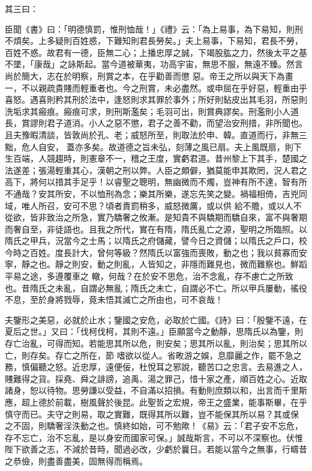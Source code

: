 \begin{pinyinscope}
 其三曰：



 臣聞《書》曰：「明德慎罰，惟刑恤哉！」《禮》云：「為上易事，為下易知，則刑不煩矣。上多疑則百姓惑，下難知則君長勞矣。」夫上易事，下易知，君長不勞，百姓不惑。故君有一德，臣無二心；上播忠厚之誠，下竭股肱之力，然後太平之基不墜，「康哉」之詠斯起。當今道被華夷，功高宇宙，無思不服，無遠不臻。然言尚於簡大，志在於明察，刑賞之本，在乎勸善而懲
 惡。帝王之所以與天下為畫一，不以親疏貴賤而輕重者也。今之刑賞，未必盡然。或申屈在乎好惡，輕重由乎喜怒。遇喜則矜其刑於法中，逢怒則求其罪於事外；所好則鉆皮出其毛羽，所惡則洗垢求其瘢痕。瘢痕可求，則刑斯濫矣；毛羽可出，則賞典謬矣。刑濫則小人道長，賞謬則君子道消。小人之惡不懲，君子之善不勸，而望治安刑措，非所聞也。且夫豫暇清談，皆敦尚於孔、老；威怒所至，則取法於申、韓。直道而行，非無三黜，危人自安，
 蓋亦多矣。故道德之旨未弘，刻薄之風已扇。夫上風既扇，則下生百端，人競趨時，則憲章不一，稽之王度，實虧君道。昔州黎上下其手，楚國之法遂差；張湯輕重其心，漢朝之刑以弊。人臣之頗僻，猶莫能申其欺罔，況人君之高下，將何以措其手足乎！以睿聖之聰明，無幽微而不燭，豈神有所不達，智有所不通哉？安其所安，不以恤刑為念；樂其所樂，遂忘先笑之變。禍福相倚，吉兇同域，唯人所召，安可不思？頃者責罰稍多，威怒微厲，或以供
 給不贍，或以人不從欲，皆非致治之所急，實乃驕奢之攸漸。是知貴不與驕期而驕自來，富不與奢期而奢自至，非徒語也。且我之所代，實在有隋，隋氏亂亡之源，聖明之所臨照。以隋氏之甲兵，況當今之士馬；以隋氏之府儲藏，譬今日之資儲；以隋氏之戶口，校今時之百姓。度長計大，曾何等級？然隋氏以富強而喪敗，動之也；我以貧寡而安寧，靜之也。靜之則安，動之則亂，人皆知之，非隱而難見也，微而難察也。鮮蹈平易之途，多遵覆車之
 轍，何哉？在於安不思危，治不念亂，存不慮亡之所致也。昔隋氏之未亂，自謂必無亂；隋氏之未亡，自謂必不亡。所以甲兵屢動，徭役不息，至於身將戮辱，竟未悟其滅亡之所由也，可不哀哉！



 夫鑒形之美惡，必就於止水；鑒國之安危，必取於亡國。《詩》曰：「殷鑒不遠，在夏后之世。」又曰：「伐柯伐柯，其則不遠。」臣願當今之動靜，思隋氏以為鑒，則存亡治亂，可得而知。若能思其所以危，則安矣；思其所以亂，則治矣；思其所以亡，則存矣。存亡之所在，節
 嗜欲以從人。省畋游之娛，息靡麗之作，罷不急之務，慎偏聽之怒。近忠厚，遠便佞，杜悅耳之邪說，聽苦口之忠言。去易進之人，賤難得之貨。採堯、舜之誹謗，追禹、湯之罪己，惜十家之產，順百姓之心。近取諸身，恕以待物。思勞謙以受益，不自滿以招損。有動則庶類以和，出言而千里斯應，超上德於前載，樹風聲於後昆。此聖哲之宏規，帝王之盛業，能事斯畢，在乎慎守而已。夫守之則易，取之實難，既得其所以難，豈不能保其所以易？其或保
 之不固，則驕奢淫泆動之也。慎終如始，可不勉歟！《易》云：「君子安不忘危，存不忘亡，治不忘亂，是以身安而國家可保。」誠哉斯言，不可以不深察也。伏惟陛下欲善之志，不減於昔時，聞過必改，少虧於曩日。若能以當今之無事，行疇昔之恭儉，則盡善盡美，固無得而稱焉。




\end{pinyinscope}
